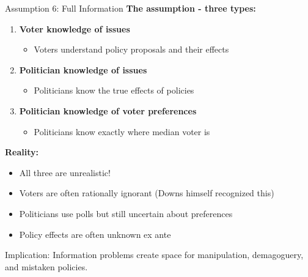 \documentclass[10pt]{beamer}
\begin{document}
\begin{frame}{Assumption 6: Full Information}
\textbf{The assumption - three types:}

\begin{enumerate}
\item \textbf{Voter knowledge of issues}
\begin{itemize}
\item Voters understand policy proposals and their effects
\end{itemize}


\item \textbf{Politician knowledge of issues}
\begin{itemize}
\item Politicians know the true effects of policies
\end{itemize}


\item \textbf{Politician knowledge of voter preferences}
\begin{itemize}
\item Politicians know exactly where median voter is
\end{itemize}
\end{enumerate}



\textbf{Reality:}
\begin{itemize}
\item \alert{All three are unrealistic!}
\item Voters are often \alert{rationally ignorant} (Downs himself recognized this)
\item Politicians use polls but still uncertain about preferences
\item Policy effects are often unknown ex ante
\end{itemize}



\alert{Implication:} Information problems create space for manipulation, demagoguery, and mistaken policies.
\end{frame}
\end{document}
